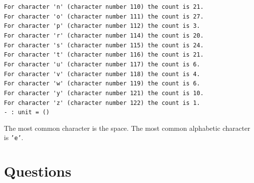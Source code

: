 \documentclass[]{book}
\newcommand{\smspace}{\vspace{4mm}}
\begin{document}
\verb!For character 'n' (character number 110) the count is 21.!\\
\verb!For character 'o' (character number 111) the count is 27.!\\
\verb!For character 'p' (character number 112) the count is 3.!\\
\verb!For character 'r' (character number 114) the count is 20.!\\
\verb!For character 's' (character number 115) the count is 24.!\\
\verb!For character 't' (character number 116) the count is 21.!\\
\verb!For character 'u' (character number 117) the count is 6.!\\
\verb!For character 'v' (character number 118) the count is 4.!\\
\verb!For character 'w' (character number 119) the count is 6.!\\
\verb!For character 'y' (character number 121) the count is 10.!\\
\verb!For character 'z' (character number 122) the count is 1.!\\
\noindent\verb!- : unit = ()!\vphantom{g}
\smspace

\noindent The most common character is the space. The most common alphabetic character is \texttt{'e'}.

\clearpage
\section*{Questions}
\end{document}
